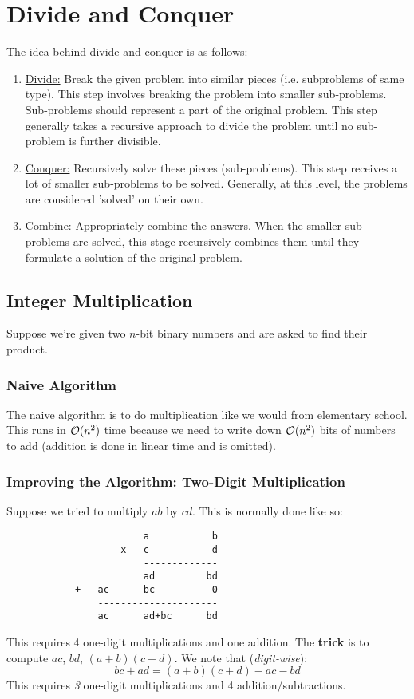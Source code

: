 \documentclass[letterpaper]{article}
\begin{document}
\section{Divide and Conquer}
The idea behind divide and conquer is as follows: 
\begin{enumerate}
    \item \underline{Divide:} Break the given problem into similar pieces (i.e. subproblems of same type). This step involves breaking the problem into smaller sub-problems. Sub-problems should represent a part of the original problem. This step generally takes a recursive approach to divide the problem until no sub-problem is further divisible.
    \item \underline{Conquer:} Recursively solve these pieces (sub-problems). This step receives a lot of smaller sub-problems to be solved. Generally, at this level, the problems are considered 'solved' on their own.
    \item \underline{Combine:} Appropriately combine the answers. When the smaller sub-problems are solved, this stage recursively combines them until they formulate a solution of the original problem.
\end{enumerate}

\subsection{Integer Multiplication}
Suppose we're given two $n$-bit binary numbers and are asked to find their product. 

\subsubsection{Naive Algorithm}
The naive algorithm is to do multiplication like we would from elementary school. This runs in $\mathcal{O}(n^2)$ time because we need to write down $\mathcal{O}(n^2)$ bits of numbers to add (addition is done in linear time and is omitted).

\subsubsection{Improving the Algorithm: Two-Digit Multiplication}
Suppose we tried to multiply $ab$ by $cd$. This is normally done like so: 
\begin{verbatim}
                        a           b
                    x   c           d
                        -------------
                        ad         bd 
            +   ac      bc          0
                ---------------------
                ac      ad+bc      bd 
\end{verbatim}
This requires 4 one-digit multiplications and one addition. The \textbf{trick} is to compute $ac$, $bd$, $(a + b)(c + d)$. We note that (\emph{digit-wise}): 
\[bc + ad = (a + b)(c + d) - ac - bd\]
This requires \emph{3} one-digit multiplications and 4 addition/subtractions.
\end{document}
